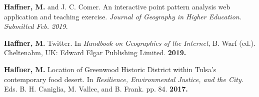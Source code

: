
\begin{cventries}
   \cventry
      {}
      {}
      {}
      {}
      {
        \begin{cvitems}
          \vspace{-4mm}
        \item
          {\textbf{Haffner, M.} and J. C. Comer.
            An interactive point pattern analysis web application and teaching
            exercise. \textit{Journal of Geography in Higher Education.
              Submitted Feb. 2019}.} \\
          \vspace{-2mm}
        \end{cvitems}
    }

\end{cventries}



\begin{cventries}
   \cventry
      {}
      {}
      {}
      {}
      {
        \begin{cvitems}
          \vspace{-4mm}
        \item {\textbf{Haffner, M.} Twitter. In \textit{Handbook on Geographies
              of the Internet}, B. Warf (ed.). Cheltenahm, UK: Edward Elgar
            Publishing Limited. \textbf{2019.}} \\
        \end{cvitems} 
    }

\end{cventries}



\begin{cventries}
   \cventry
      {}
      {}
      {}
      {}
      {
        \begin{cvitems}
          \vspace{-4mm}
        \item {\textbf{Haffner, M.} Location of Greenwood Historic District
            within Tulsa's contemporary food desert. In \textit{Resilience,
              Environmental Justice, and the City.} Eds. B. H. Caniglia, M.
            Vallee, and B.
            Frank. pp. 84. \textbf{2017.}} \\
          \vspace{-2mm}
        \end{cvitems}
    }

\end{cventries}